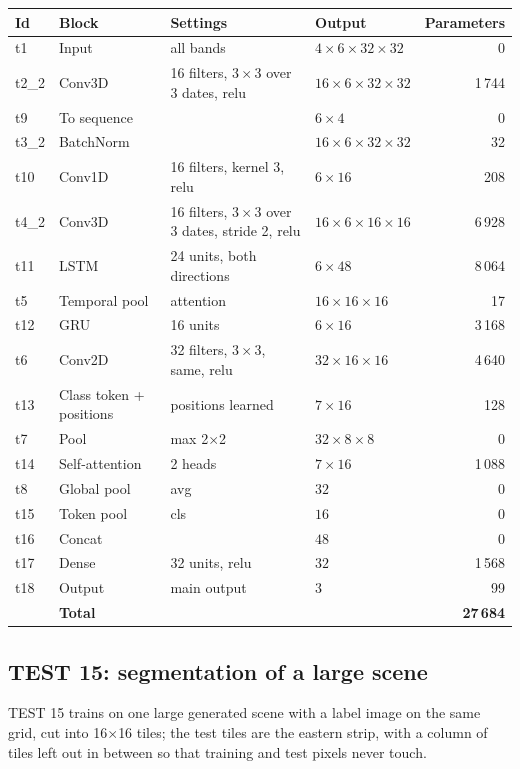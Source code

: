 {\small
\begin{longtable}{@{}lp{3.2cm}p{5.4cm}lr@{}}
\toprule
\textbf{Id} & \textbf{Block} & \textbf{Settings} & \textbf{Output} & \textbf{Parameters}\\
\midrule\endhead
t1 & Input & all bands & $4\times6\times32\times32$ & 0\\
t2\_2 & Conv3D & 16 filters, $3\times3$ over 3 dates, relu & $16\times6\times32\times32$ & 1\,744\\
t9 & To sequence &  & $6\times4$ & 0\\
t3\_2 & BatchNorm &  & $16\times6\times32\times32$ & 32\\
t10 & Conv1D & 16 filters, kernel 3, relu & $6\times16$ & 208\\
t4\_2 & Conv3D & 16 filters, $3\times3$ over 3 dates, stride 2, relu & $16\times6\times16\times16$ & 6\,928\\
t11 & LSTM & 24 units, both directions & $6\times48$ & 8\,064\\
t5 & Temporal pool & attention & $16\times16\times16$ & 17\\
t12 & GRU & 16 units & $6\times16$ & 3\,168\\
t6 & Conv2D & 32 filters, $3\times3$, same, relu & $32\times16\times16$ & 4\,640\\
t13 & Class token + positions & positions learned & $7\times16$ & 128\\
t7 & Pool & max 2$\times$2 & $32\times8\times8$ & 0\\
t14 & Self-attention & 2 heads & $7\times16$ & 1\,088\\
t8 & Global pool & avg & $32$ & 0\\
t15 & Token pool & cls & $16$ & 0\\
t16 & Concat &  & $48$ & 0\\
t17 & Dense & 32 units, relu & $32$ & 1\,568\\
t18 & Output & main output & $3$ & 99\\
\midrule
 & \textbf{Total} & & & \textbf{27\,684}\\
\bottomrule
\end{longtable}}

\subsection{TEST 15: segmentation of a large scene}
\label{sec:test15}

TEST 15 trains on one large generated scene with a label image on the same grid, cut into 16$\times$16 tiles; the test tiles are the eastern strip, with a column of tiles left out in between so that training and test pixels never touch.

